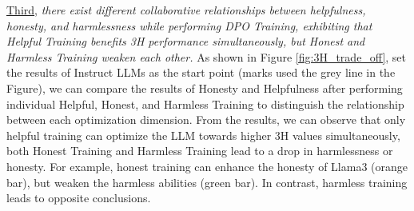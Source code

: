\underline{Third}, \textit{there exist different collaborative relationships between helpfulness, honesty, and harmlessness while performing DPO Training, exhibiting that Helpful Training benefits 3H performance simultaneously, but Honest and Harmless Training weaken each other.} As shown in Figure \ref{fig:3H_trade_off}, set the results of Instruct LLMs as the start point (marks used the grey line in the Figure), we can compare the results of Honesty and Helpfulness after performing individual Helpful, Honest, and Harmless Training to distinguish the relationship between each optimization dimension. From the results, we can observe that only helpful training can optimize the LLM towards higher 3H values simultaneously, both Honest Training and Harmless Training lead to a drop in harmlessness or honesty. For example, honest training can enhance the honesty of Llama3 (orange bar), but weaken the harmless abilities (green bar). In contrast, harmless training leads to opposite conclusions.




